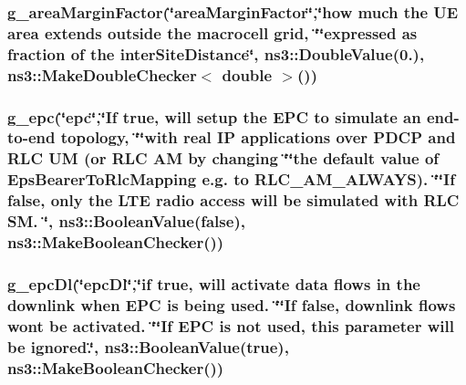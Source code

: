\subsubsection[{\texorpdfstring{g\+\_\+area\+Margin\+Factor}{g_areaMarginFactor}}]{ g\+\_\+area\+Margin\+Factor(\char`\"{}area\+Margin\+Factor\char`\"{},\char`\"{}how much the UE area extends outside the macrocell grid, \char`\"{}\char`\"{}expressed as fraction of the inter\+Site\+Distance\char`\"{}, ns3\+::\+Double\+Value(0.), {\bf ns3\+::\+Make\+Double\+Checker}$<$ double $>$())\hspace{0.3cm}{\ttfamily [static]}}\hypertarget{lena-dual-stripe_8cc_af8bc4d58fc45859c4cc5d46056918f8a}{}\label{lena-dual-stripe_8cc_af8bc4d58fc45859c4cc5d46056918f8a}
\subsubsection[{\texorpdfstring{g\+\_\+epc}{g_epc}}]{ g\+\_\+epc(\char`\"{}epc\char`\"{},\char`\"{}If true, will setup the E\+PC to simulate an end-\/to-\/end topology, \char`\"{}\char`\"{}with real IP applications over P\+D\+CP and R\+LC UM (or R\+LC AM by changing \char`\"{}\char`\"{}the default value of Eps\+Bearer\+To\+Rlc\+Mapping e.\+g. to R\+L\+C\+\_\+\+A\+M\+\_\+\+A\+L\+W\+A\+YS). \char`\"{}\char`\"{}If {\bf false}, only the L\+TE radio access will be simulated with R\+LC S\+M. \char`\"{}, ns3\+::\+Boolean\+Value({\bf false}), ns3\+::\+Make\+Boolean\+Checker())\hspace{0.3cm}{\ttfamily [static]}}\hypertarget{lena-dual-stripe_8cc_a798fe59724c3c39d7af3081cd2c1e56c}{}\label{lena-dual-stripe_8cc_a798fe59724c3c39d7af3081cd2c1e56c}
\subsubsection[{\texorpdfstring{g\+\_\+epc\+Dl}{g_epcDl}}]{ g\+\_\+epc\+Dl(\char`\"{}epc\+Dl\char`\"{},\char`\"{}{\bf if} true, will activate {\bf data} {\bf flows} in the downlink when E\+PC is being used. \char`\"{}\char`\"{}If {\bf false}, downlink {\bf flows} won\textquotesingle{}t be activated. \char`\"{}\char`\"{}If E\+PC is not used, this parameter will be ignored.\char`\"{}, ns3\+::\+Boolean\+Value(true), ns3\+::\+Make\+Boolean\+Checker())\hspace{0.3cm}{\ttfamily [static]}}\hypertarget{lena-dual-stripe_8cc_a9a55e10db14ae8de0f8a99e39217c7e5}{}\label{lena-dual-stripe_8cc_a9a55e10db14ae8de0f8a99e39217c7e5}
